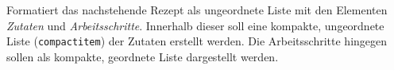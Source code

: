 Formatiert das nachstehende Rezept als ungeordnete Liste mit den Elementen \emph{Zutaten} und \emph{Arbeitsschritte}. Innerhalb dieser soll eine kompakte, ungeordnete Liste (\texttt{compactitem}) der Zutaten erstellt werden. Die Arbeitsschritte hingegen sollen als kompakte, geordnete Liste dargestellt werden.

